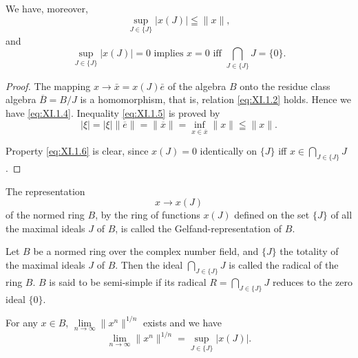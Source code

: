 We have, moreover, 
\begin{equation}\label{eq:XI.1.5}
\sup\limits _ {J \in \{J \}} | x (J) | \leqq \| x \|,
\end{equation}
and 
\begin{equation}\label{eq:XI.1.6}
\sup\limits _ {J \in \{J \}} | x (J) | = 0 \text{ implies } x = 0 \text{ iff } \bigcap\limits_ {J \in \{J \}} J = \{0 \}.
\end{equation}

\begin{proof}
 The mapping $x \to \bar{x} = x(J) \bar{e}$ of the algebra $B$ onto the residue class algebra $\overline{B} = B/J$ is a homomorphism, that is, relation \eqref{eq:XI.1.2} holds. Hence we have \eqref{eq:XI.1.4}. Inequality \eqref{eq:XI.1.5} is proved by 
\[
| \xi | = | \xi | \| \overline {{e}} \| = \| \overline {{x}} \| = \inf\limits _ {x \in \overline {{x}}} \| x \| \leqq \| x \|. \]

Property \eqref{eq:XI.1.6} is clear, since $x(J) = 0$ identically on $\{J\}$ iff $x \in \bigcap\limits_{J \in \{J\}} J$. 
\end{proof}

\begin{definition}\label{def:XI.1.Definition.3} The representation 
\begin{equation}\label{eq:XI.1.7}
x \rightarrow x (J)
\end{equation}
of the normed ring $B$, by the ring of functions $x(J)$ defined on the set $\{J\}$ of all the maximal ideals $J$ of $B$, is called the Gelfand-representation of $B$. 
\end{definition}


\label{sec:XI.2}

\begin{definition}\label{def:XI.2.Definition.1} Let $B$ be a normed ring over the complex number field, and $\{J\}$ the totality of the maximal ideals $J$ of $B$. Then the ideal $\bigcap\limits_{J \in \{J\}} J$ is called the radical of the ring $B$. $B$ is said to be semi-simple if its radical $R = \bigcap\limits_{J \in \{J\}} J$ reduces to the zero ideal $\{0\}$. 
\end{definition}

\begin{theorem}\label{thm:XI.2.Theorem.1} For any $x \in B$, $\lim\limits_{n \to \infty} \| x^n \|^{1/n}$ exists and we have 
\begin{equation}\label{eq:XI.2.1}
\lim\limits _{n \rightarrow \infty} \| x ^{n} \| ^{1/n} = \sup\limits _ {J \in \{J \}} | x (J) |.
\end{equation}
\end{theorem}

